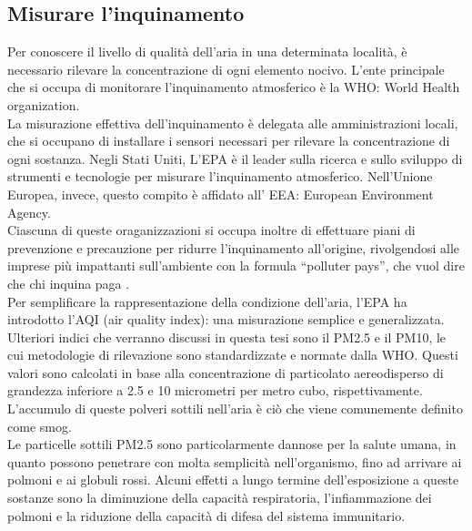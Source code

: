 \subsection{Misurare l'inquinamento}
Per conoscere il livello di qualità dell’aria in una determinata località, è necessario rilevare la concentrazione di ogni elemento nocivo. 
L'ente principale che si occupa di monitorare l'inquinamento atmosferico è la WHO: World Health organization.
\\
La misurazione effettiva dell'inquinamento è delegata alle amministrazioni locali, che si occupano di installare i sensori necessari per rilevare la concentrazione di ogni sostanza.
Negli Stati Uniti, L'EPA è il leader sulla ricerca e sullo sviluppo di strumenti e tecnologie per misurare l'inquinamento atmosferico.
Nell'Unione Europea, invece, questo compito è affidato all' EEA: European Environment Agency.
\\
Ciascuna di queste oraganizzazioni si occupa inoltre di effettuare piani di prevenzione e precauzione per ridurre l'inquinamento all'origine, rivolgendosi alle imprese più impattanti sull'ambiente con la formula “polluter pays”, che vuol dire che chi inquina paga \cite{polluter_pays}.
\\ 
Per semplificare la rappresentazione della condizione dell’aria, l’EPA ha introdotto l’AQI (air quality index): una misurazione semplice e generalizzata.
Ulteriori indici che verranno discussi in questa tesi sono il PM2.5 e il PM10, le cui metodologie di rilevazione sono standardizzate e normate dalla WHO.
Questi valori sono calcolati in base alla concentrazione di particolato aereodisperso di grandezza inferiore a 2.5 e 10 micrometri per metro cubo, rispettivamente.
L'accumulo di queste polveri sottili nell'aria è ciò che viene comunemente definito come smog.
\\
Le particelle sottili PM2.5 sono particolarmente dannose per la salute umana, in quanto possono penetrare con molta semplicità nell'organismo, fino ad arrivare ai polmoni e ai globuli rossi.
Alcuni effetti a lungo termine dell'esposizione a queste sostanze sono la diminuzione della capacità respiratoria, l'infiammazione dei polmoni e la riduzione della capacità di difesa del sistema immunitario.
